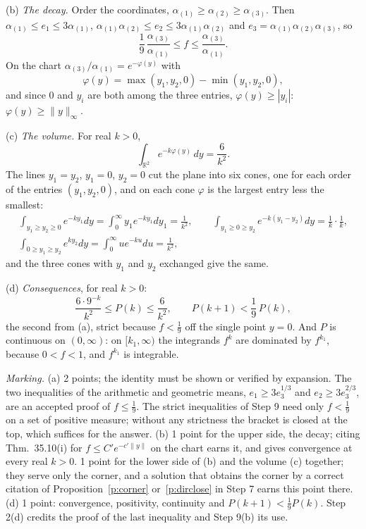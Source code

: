 \documentclass[11pt]{article}
\theoremstyle{plain}
\theoremstyle{definition}
\theoremstyle{remark}
\begin{document}
(b) \emph{The decay.} Order the coordinates, $\alpha_{(1)}\ge\alpha_{(2)}\ge\alpha_{(3)}$. Then $\alpha_{(1)}\le e_1\le3\alpha_{(1)}$, $\alpha_{(1)}\alpha_{(2)}\le e_2\le3\alpha_{(1)}\alpha_{(2)}$ and $e_3=\alpha_{(1)}\alpha_{(2)}\alpha_{(3)}$, so
\[
\frac19\,\frac{\alpha_{(3)}}{\alpha_{(1)}}\le f\le\frac{\alpha_{(3)}}{\alpha_{(1)}} .
\]
On the chart $\alpha_{(3)}/\alpha_{(1)}=e^{-\varphi(y)}$ with
\[
\varphi(y)=\max(y_1,y_2,0)-\min(y_1,y_2,0),
\]
and since $0$ and $y_i$ are both among the three entries, $\varphi(y)\ge|y_i|$: $\varphi(y)\ge\|y\|_\infty$.

(c) \emph{The volume.} For real $k>0$,
\[
\int_{\mathbb R^2}e^{-k\varphi(y)}\,dy=\frac6{k^2}.
\]
The lines $y_1=y_2$, $y_1=0$, $y_2=0$ cut the plane into six cones, one for each order of the entries $(y_1,y_2,0)$, and on each cone $\varphi$ is the largest entry less the smallest:
\begin{gather*}
\int_{y_1\ge y_2\ge0}e^{-ky_1}dy=\int_0^\infty y_1e^{-ky_1}dy_1=\frac1{k^2},\qquad
\int_{y_1\ge0\ge y_2}e^{-k(y_1-y_2)}dy=\frac1k\cdot\frac1k,\\
\int_{0\ge y_1\ge y_2}e^{ky_2}dy=\int_0^\infty ue^{-ku}du=\frac1{k^2},
\end{gather*}
and the three cones with $y_1$ and $y_2$ exchanged give the same.

(d) \emph{Consequences}, for real $k>0$:
\[
\frac{6\cdot9^{-k}}{k^2}\le P(k)\le\frac6{k^2},\qquad P(k+1)<\frac19\,P(k),
\]
the second from (a), strict because $f<\frac19$ off the single point $y=0$. And $P$ is continuous on $(0,\infty)$: on $[k_1,\infty)$ the integrands $f^k$ are dominated by $f^{k_1}$, because $0<f<1$, and $f^{k_1}$ is integrable.

\smallskip\noindent\emph{Marking.} (a) 2 points; the identity must be shown or verified by expansion. The two inequalities of the arithmetic and geometric means, $e_1\ge3e_3^{1/3}$ and $e_2\ge3e_3^{2/3}$, are an accepted proof of $f\le\frac19$. The strict inequalities of Step 9 need only $f<\frac19$ on a set of positive measure; without any strictness the bracket is closed at the top, which suffices for the answer. (b) 1 point for the upper side, the decay; citing Thm.~35.10(i) for $f\le C'e^{-c'\|y\|}$ on the chart earns it, and gives convergence at every real $k>0$. 1 point for the lower side of (b) and the volume (c) together; they serve only the corner, and a solution that obtains the corner by a correct citation of Proposition~\ref{p:corner} or~\ref{p:dirclose} in Step 7 earns this point there. (d) 1 point: convergence, positivity, continuity and $P(k+1)<\frac19P(k)$. Step 2(d) credits the proof of the last inequality and Step 9(b) its use.
\end{document}
